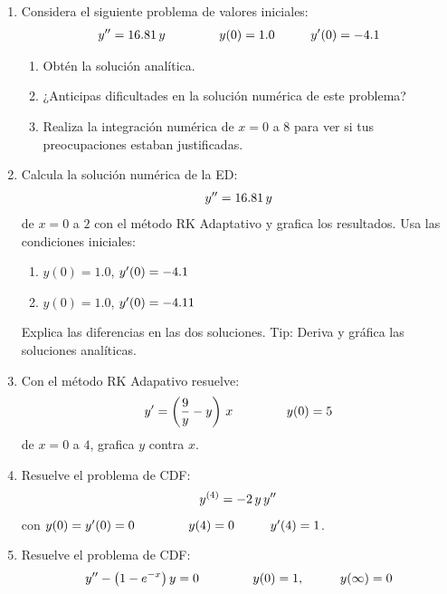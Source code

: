 \begin{enumerate}
\item Considera el siguiente problema de valores iniciales:
\begin{align*}
{y}^{\prime \prime} = 16.81 \, y \hspace{1.5cm} y (0) = 1.0 \hspace{1cm} {y}^{\prime} (0) = -4.1
\end{align*}
\begin{enumerate}
\item Obtén la solución analítica.
\item ¿Anticipas dificultades en la solución numérica de este problema?
\item Realiza la integración numérica de $x = 0$ a $8$ para ver si tus preocupaciones estaban justificadas.
\end{enumerate}
\item Calcula la solución numérica de la ED:
\begin{align*}
{y}^{\prime \prime} = 16.81 \, y
\end{align*}
de $x = 0$ a $2$ con el método RK Adaptativo y grafica los resultados. Usa las condiciones iniciales:
\begin{enumerate}
\item $y (0) = 1.0$, ${y}^{\prime} (0) = -4.1$
\item $y (0) = 1.0$, ${y}^{\prime} (0) = -4.11$
\end{enumerate} 
Explica las diferencias en las dos soluciones. Tip: Deriva y gráfica las soluciones analíticas.
\item Con el método RK Adapativo resuelve:
\begin{align*}
{y}^{\prime} = \left( \dfrac{9}{y} - y \right)  \, x \hspace{1.5cm} y (0) = 5
\end{align*}
de $x = 0$ a $4$, grafica $y$ contra $x$.
\item Resuelve el problema de CDF:
\begin{align*}
{y}^{(4)} = -2 \, y \, {y}^{\prime \prime}
\end{align*}
con $y (0) = {y}^{\prime} (0) = 0 \hspace{1.5cm} y (4) = 0 \hspace{1cm} {y}^{\prime} (4) = 1$.
\item Resuelve el problema de CDF:
\begin{align*}
\sderivada{y} - \big( 1 - e^{-x} \big) \, y = 0 \hspace{1.5cm} y (0) = 1, \hspace{1cm} y (\infty) = 0

\end{align*}
\end{enumerate}
